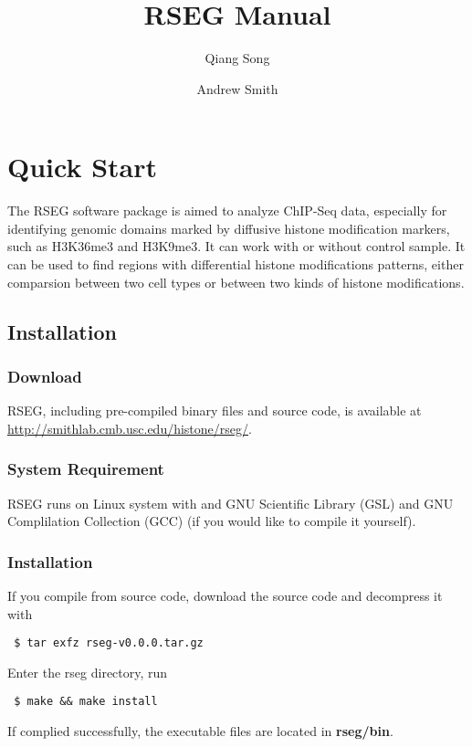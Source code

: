 \documentclass[11pt]{report}
\title{RSEG Manual}
\author{Qiang Song \and Andrew Smith}
\begin{document}
\maketitle

\chapter{Quick Start}
\label{chap:quick-start}

The RSEG software package is aimed to analyze ChIP-Seq data,
especially for identifying genomic domains marked by diffusive histone
modification markers, such as H3K36me3 and H3K9me3. It can work with
or without control sample. It can be used to find regions with
differential histone modifications patterns, either comparsion between
two cell types or between two kinds of histone modifications.

\section{Installation}
\label{sec:install}

\subsection*{Download}

RSEG, including pre-compiled binary files and source code, is
available at \url{http://smithlab.cmb.usc.edu/histone/rseg/}.

\subsection*{System Requirement}

RSEG runs on Linux system with and GNU Scientific Library (GSL) and
GNU Complilation Collection (GCC) (if you would like to compile it
yourself).

\subsection*{Installation}

If you compile from source code, download the source code and
decompress it with
\begin{verbatim}
 $ tar exfz rseg-v0.0.0.tar.gz
\end{verbatim}
%
Enter the rseg directory, run
\begin{verbatim}
 $ make && make install
\end{verbatim}
%
If complied successfully, the executable files are located in \textbf{rseg/bin}.
\end{document}
